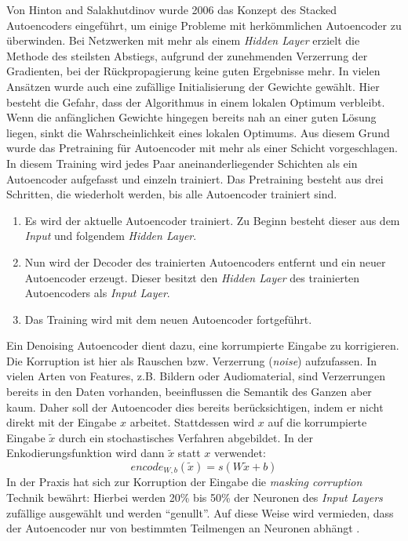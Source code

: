 Von Hinton and Salakhutdinov wurde 2006 \cite{dae2006} das Konzept des Stacked Autoencoders eingeführt, um einige Probleme mit herkömmlichen Autoencoder zu überwinden. Bei Netzwerken mit mehr als einem \textit{Hidden Layer} erzielt die Methode des steilsten Abstiegs, aufgrund der zunehmenden Verzerrung der Gradienten, bei der Rückpropagierung keine guten Ergebnisse mehr. In vielen Ansätzen wurde auch eine zufällige Initialisierung der Gewichte gewählt. Hier besteht die Gefahr, dass der Algorithmus in einem lokalen Optimum verbleibt. Wenn die anfänglichen Gewichte hingegen bereits nah an einer guten Lösung liegen, sinkt die Wahrscheinlichkeit eines lokalen Optimums. Aus diesem Grund wurde das Pretraining für Autoencoder mit mehr als einer Schicht vorgeschlagen. In diesem Training wird jedes Paar aneinanderliegender Schichten als ein Autoencoder aufgefasst und einzeln trainiert. Das Pretraining besteht aus drei Schritten, die wiederholt werden, bis alle Autoencoder trainiert sind.

\begin{enumerate}
	\item Es wird der aktuelle Autoencoder trainiert. Zu Beginn besteht dieser aus dem \textit{Input} und folgendem \textit{Hidden Layer}.
	\item Nun wird der Decoder des trainierten Autoencoders entfernt und ein neuer Autoencoder erzeugt. Dieser besitzt den \textit{Hidden Layer} des trainierten Autoencoders als \textit{Input Layer}.
	\item Das Training wird mit dem neuen Autoencoder fortgeführt.
\end{enumerate}

Ein Denoising Autoencoder \cite{sda2010} dient dazu, eine korrumpierte Eingabe zu korrigieren. Die Korruption ist hier als Rauschen bzw. Verzerrung (\textit{noise}) aufzufassen. In vielen Arten von Features, z.B. Bildern oder Audiomaterial, sind Verzerrungen bereits in den Daten vorhanden, beeinflussen die Semantik des Ganzen aber kaum. Daher soll der Autoencoder dies bereits berücksichtigen, indem er nicht direkt mit der Eingabe $x$ arbeitet. Stattdessen wird $x$ auf die korrumpierte Eingabe $\widetilde{x}$ durch ein stochastisches Verfahren abgebildet. In der Enkodierungsfunktion wird dann $\widetilde{x}$ statt $x$ verwendet: 
$$encode_{W,b}(\widetilde{x}) = s(W\widetilde{x} + b)$$
In der Praxis hat sich zur Korruption der Eingabe die \textit{masking corruption} Technik bewährt: Hierbei werden 20\% bis 50\% der Neuronen des \textit{Input Layers} zufällige ausgewählt und werden \enquote{genullt}. Auf diese Weise wird vermieden, dass der Autoencoder nur von bestimmten Teilmengen an Neuronen abhängt  \cite{pda2012}.

